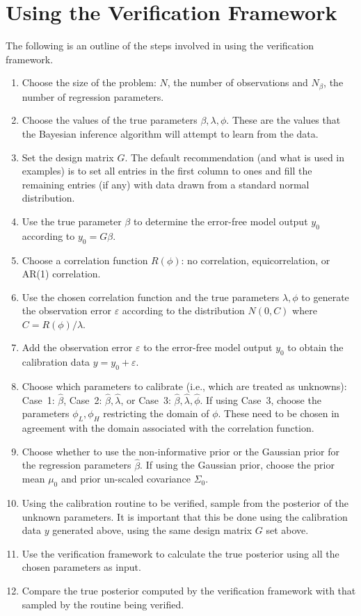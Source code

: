 \documentclass{book}
\begin{document}
\chapter{Using the Verification Framework}
The following is an outline of the steps involved in using the verification framework.
\begin{enumerate}
\item Choose the size of the problem: $N$, the number of observations and $N_\beta$, the number of
	regression parameters. 
\item Choose the values of the true parameters $\beta, \lambda, \phi$. These are the values that the Bayesian inference
	algorithm will attempt to learn from the data. 
\item Set the design matrix $G$. The default recommendation (and what is used in examples) is to set all entries in the first
	column to ones and fill the remaining entries (if any) with data drawn from a standard normal distribution.
\item Use the true parameter $\beta$ to determine the error-free model output $y_0$ according to $y_0 = G\beta$. 
\item Choose a correlation function $R(\phi)$: no correlation, equicorrelation, or AR(1) correlation. 
\item Use the chosen correlation function and the true parameters $\lambda, \phi$ to generate the observation error
	$\varepsilon$ according to the distribution $N(0, C)$ where $C = R(\phi) / \lambda$. 
\item Add the observation error $\varepsilon$ to the error-free model output $y_0$ to obtain the calibration data 
	$y = y_0 + \varepsilon$. 
\item Choose which parameters to calibrate (i.e., which are treated as unknowns): 
	Case~1: $\hat \beta$, 
	Case~2: $\hat\beta, \hat \lambda$, or
	Case~3: $\hat\beta, \hat \lambda, \hat \phi$. If using Case~3, choose the parameters $\phi_L, \phi_H$
	restricting the domain of $\phi$. These need to be chosen in agreement with the domain associated with the
	correlation function. 
\item Choose whether to use the non-informative prior or the Gaussian prior for the regression parameters $\hat \beta$.
	If using the Gaussian prior, choose the prior mean $\mu_0$ and prior un-scaled covariance $\Sigma_0$.
\item Using the calibration routine to be verified, sample from the posterior of the unknown parameters. It is important that this 
	be done using the calibration data $y$ generated above, using the same design matrix $G$ set above.
\item Use the verification framework to calculate the true posterior using all the chosen parameters as input.
\item Compare the true posterior computed by the verification framework with that sampled by the routine being verified.
\end{enumerate}
\end{document}
